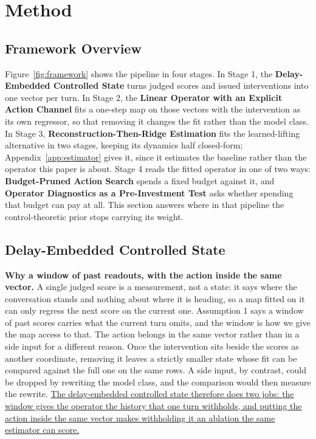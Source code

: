 \section{Method}
\label{sec:method}

\subsection{Framework Overview}

Figure~\ref{fig:framework} shows the pipeline in four stages. In Stage 1, the
\textbf{Delay-Embedded Controlled State} turns judged scores and issued interventions into one
vector per turn. In Stage 2, the \textbf{Linear Operator with an Explicit Action Channel} fits
a one-step map on those vectors with the intervention as its own regressor, so that removing it
changes the fit rather than the model class. In Stage 3, \textbf{Reconstruction-Then-Ridge
Estimation} fits the learned-lifting alternative in two stages, keeping its dynamics half
closed-form; Appendix~\ref{app:estimator} gives it, since it estimates the baseline rather than
the operator this paper is about. Stage 4 reads the fitted operator in one of two ways: \textbf{Budget-Pruned Action
Search} spends a fixed budget against it, and \textbf{Operator Diagnostics as a Pre-Investment
Test} asks whether spending that budget can pay at all. This section answers where in that
pipeline the control-theoretic prior stops carrying its weight.

\subsection{Delay-Embedded Controlled State}

\textbf{Why a window of past readouts, with the action inside the same vector.} A single
judged score is a measurement, not a state: it says where the conversation stands and nothing
about where it is heading, so a map fitted on it can only regress the next score on the current
one. Assumption 1 says a window of past scores carries what the current turn omits, and the
window is how we give the map access to that. The action belongs in the same vector rather than
in a side input for a different reason. Once the intervention sits beside the scores as another
coordinate, removing it leaves a strictly smaller state whose fit can be compared against the
full one on the same rows. A side input, by contrast, could be dropped by rewriting the model
class, and the comparison would then measure the rewrite.
\uline{The delay-embedded controlled state therefore does two jobs: the window gives the
operator the history that one turn withholds, and putting the action inside the same vector
makes withholding it an ablation the same estimator can score.}

